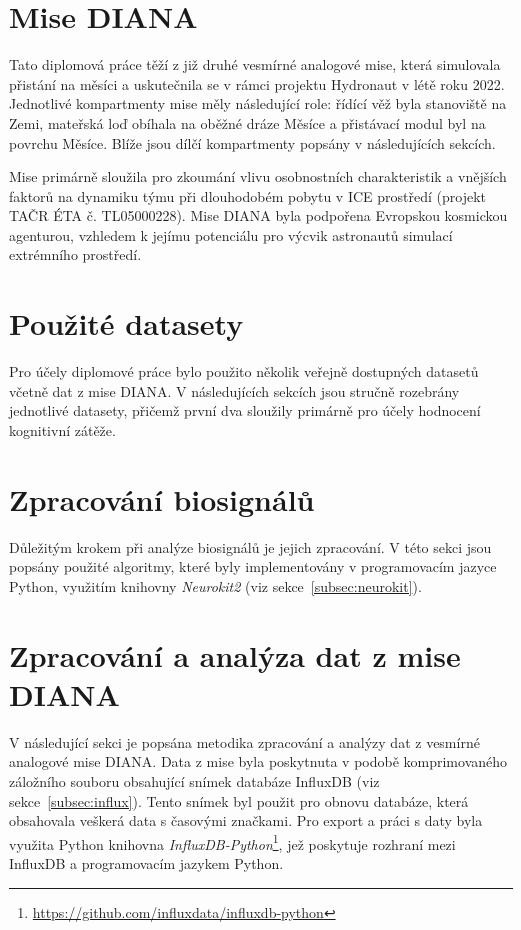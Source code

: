 \section{Mise DIANA}
\label{sec:mise_diana}
Tato diplomová práce těží z již druhé vesmírné analogové mise, která simulovala
přistání na měsíci a uskutečnila se v rámci projektu Hydronaut v létě roku 2022.
Jednotlivé kompartmenty mise měly následující role: řídící věž byla stanoviště
na Zemi, mateřská loď obíhala na oběžné dráze Měsíce a přistávací modul byl na
povrchu Měsíce. Blíže jsou dílčí kompartmenty popsány v následujících sekcích.

Mise primárně sloužila pro zkoumání vlivu osobnostních charakteristik a vnějších
faktorů na dynamiku týmu při dlouhodobém pobytu v \gls{ICE} prostředí (projekt
TAČR ÉTA č. TL05000228). Mise DIANA byla podpořena Evropskou kosmickou
agenturou, vzhledem k jejímu potenciálu pro výcvik astronautů simulací
extrémního prostředí. 


\section{Použité datasety}
\label{sec:datasety}
Pro účely diplomové práce bylo použito několik veřejně dostupných datasetů
včetně dat z mise DIANA. V následujících sekcích jsou stručně rozebrány
jednotlivé datasety, přičemž první dva sloužily primárně pro účely hodnocení
kognitivní zátěže.


\section{Zpracování biosignálů}
\label{sec:zpracovani_biosignalu}
Důležitým krokem při analýze biosignálů je jejich zpracování. V této sekci jsou
popsány použité algoritmy, které byly implementovány v programovacím jazyce
Python, využitím knihovny \textit{Neurokit2} (viz sekce~\ref{subsec:neurokit}).


\section{Zpracování a analýza dat z mise DIANA}
\label{sec:zpracovani_dat_diana}
V následující sekci je popsána metodika zpracování a analýzy dat z vesmírné
analogové mise DIANA. Data z mise byla poskytnuta v podobě komprimovaného
záložního souboru obsahující snímek databáze InfluxDB (viz
sekce~\ref{subsec:influx}). Tento snímek byl použit pro obnovu databáze, která
obsahovala veškerá data s časovými značkami. Pro export a práci s daty byla
využita Python knihovna
\textit{InfluxDB-Python}\footnote{\url{https://github.com/influxdata/influxdb-python}},
jež poskytuje rozhraní mezi InfluxDB a programovacím jazykem Python. 


